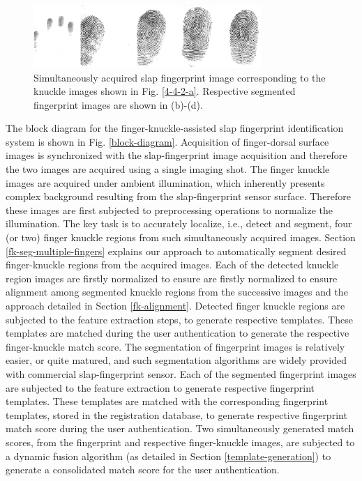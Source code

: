 \begin{figure}[!ht]
    \centering
    \includegraphics[width=3.4in]{Figures/4-4-2-fingerprint.png}
    \caption{Simultaneously acquired slap fingerprint image corresponding to the knuckle images shown in Fig. \ref{4-4-2-a}. Respective segmented fingerprint images are shown in (b)-(d).}
    \label{capture-finerprint}
\end{figure}

The block diagram for the finger-knuckle-assisted slap fingerprint identification system is shown in Fig. \ref{block-diagram}. Acquisition of finger-dorsal surface images is synchronized with the slap-fingerprint image acquisition and therefore the two images are acquired using a single imaging shot. The finger knuckle images are acquired under ambient illumination, which inherently presents complex background resulting from the slap-fingerprint sensor surface. Therefore these images are first subjected to preprocessing operations to normalize the illumination. The key task is to accurately localize, i.e., detect and segment, four (or two) finger knuckle regions from such simultaneously acquired images. Section \ref{fk-seg-multiple-fingers} explains our approach to automatically segment desired finger-knuckle regions from the acquired images. Each   of   the   detected   knuckle   region   images  are  firstly normalized to ensure are  firstly normalized to ensure alignment among segmented knuckle regions from the successive images and the approach detailed in Section \ref{fk-alignment}. Detected finger knuckle regions are subjected to the feature extraction steps, to generate respective templates. These templates are matched during the user authentication to generate the respective finger-knuckle match score. The segmentation of fingerprint images is relatively easier, or quite matured, and such segmentation algorithms are widely provided with commercial slap-fingerprint sensor. Each of the segmented fingerprint images are subjected to the feature extraction to generate respective fingerprint templates. These templates are matched with the corresponding fingerprint templates, stored in the registration database, to generate respective fingerprint match score during the user authentication. Two simultaneously generated match scores, from the fingerprint and respective finger-knuckle images, are subjected to a dynamic fusion algorithm (as detailed in Section \ref{template-generation}) to generate a consolidated match score for the user authentication.   


